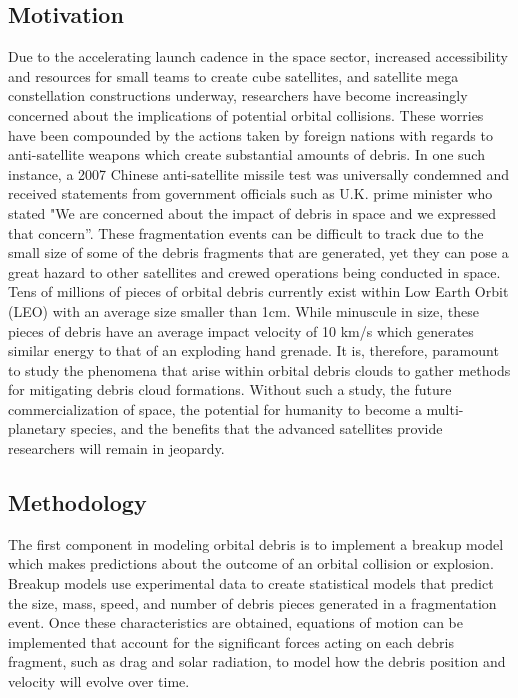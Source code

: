 \documentclass{article}
\begin{document}
\subsection{Motivation}
Due to the accelerating launch cadence in the space sector, increased accessibility and resources for small teams to create cube satellites, and satellite mega constellation constructions underway, researchers have become increasingly concerned about the implications of potential orbital collisions. These worries have been compounded by the actions taken by foreign nations with regards to anti-satellite weapons which create substantial amounts of debris. In one such instance, a 2007 Chinese anti-satellite missile test was universally condemned and received statements from government officials such as U.K. prime minister who stated "We are concerned about the impact of debris in space and we expressed that concern”. These fragmentation events can be difficult to track due to the small size of some of the debris fragments that are generated, yet they can pose a great hazard to other satellites and crewed operations being conducted in space. Tens of millions of pieces of orbital debris currently exist within Low Earth Orbit (LEO) with an average size smaller than 1cm. While minuscule in size, these pieces of debris have an average impact velocity of 10 km/s which generates similar energy to that of an exploding hand grenade. It is, therefore, paramount to study the phenomena that arise within orbital debris clouds to gather methods for mitigating debris cloud formations. Without such a study, the future commercialization of space, the potential for humanity to become a multi-planetary species, and the benefits that the advanced satellites provide researchers will remain in jeopardy.%
\subsection{Methodology}
The first component in modeling orbital debris is to implement a breakup model which makes predictions about the outcome of an orbital collision or explosion. Breakup models use experimental data to create statistical models that predict the size, mass, speed, and number of debris pieces generated in a fragmentation event. Once these characteristics are obtained, equations of motion can be implemented that account for the significant forces acting on each debris fragment, such as drag and solar radiation, to model how the debris position and velocity will evolve over time. 
\end{document}
